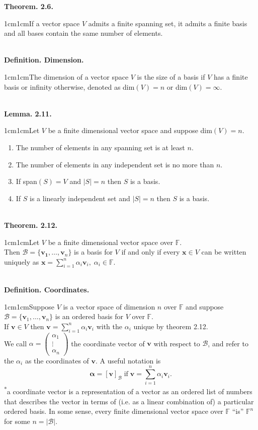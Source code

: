 \documentclass{article}
\newcommand{\vect}[1]{\mathbf{#1}}
\newcommand{\definition}[2]{\textbf{Definition. #1.}\begin{adjustwidth}{1cm}{1cm}#2\end{adjustwidth}}
\newcommand{\theorem}[2]{\textbf{Theorem. #1.}\begin{adjustwidth}{1cm}{1cm}#2\end{adjustwidth}}
\newcommand{\lemma}[2]{\textbf{Lemma. #1.}\begin{adjustwidth}{1cm}{1cm}#2\end{adjustwidth}}
\begin{document}
\theorem{2.6}{If a vector space $V$ admits a finite spanning set, it admits a finite basis and all bases contain the same number of elements.}~\\
\definition{Dimension}{The dimension of a vector space $V$ is the size of a basis if $V$ has a finite basis or infinity otherwise, denoted as dim$(V) = n$ or dim$(V) = \infty$.}~\\
\lemma{2.11}{Let $V$ be a finite dimensional vector space and suppose dim$(V) = n$. \begin{enumerate} \item The number of elements in any spanning set is at least $n$. \item The number of elements in any independent set is no more than $n$. \item If span$(S) = V$ and $|S| = n$ then $S$ is a basis. \item If $S$ is a linearly independent set and $|S| = n$ then $S$ is a basis. \end{enumerate} }~\\
\theorem{2.12}{Let $V$ be a finite dimensional vector space over $\mathbb{F}$.\\Then $\mathcal{B} = \{ \vect{v_1}, \ldots , \vect{v}_n \}$ is a basis for $V$ if and only if every $\vect{x} \in V$ can be written uniquely as $\vect{x} = \sum_{i=1}^n \alpha _i \vect{v}_i, \; \alpha _i \in \mathbb{F}$.}~\\
\definition{Coordinates}{Suppose $V$ is a vector space of dimension $n$ over $\mathbb{F}$ and suppose $\mathcal{B} = \{ \vect{v}_1, \ldots , \vect{v}_n \}$ is an ordered basis for $V$ over $\mathbb{F}$.\\If $\vect{v} \in V$ then $\vect{v} = \sum_{i=1}^n \alpha_i \vect{v}_i$ with the $\alpha_i$ unique by theorem 2.12.\\We call $\alpha = \begin{pmatrix}\alpha_1 \\ \vdots \\ \alpha_n\end{pmatrix}$ the coordinate vector of $\vect{v}$ with respect to $\mathcal{B}$, and refer to the $\alpha_i$ as the coordinates of $\vect{v}$. A useful notation is \[\vect{\alpha} = [\vect{v}]_{\mathcal{B}} \; \text{if} \; \vect{v} = \sum_{i=1}^n \alpha_i \vect{v} _i.\]\textsuperscript{*}a coordinate vector is a representation of a vector as an ordered list of numbers that describes the vector in terms of (i.e. as a linear combination of) a particular ordered basis. In some sense, every finite dimensional vector space over $\mathbb{F}$ ``is'' $\mathbb{F}^n$ for some $n = |\mathcal{B}|$.}~\\
\end{document}
